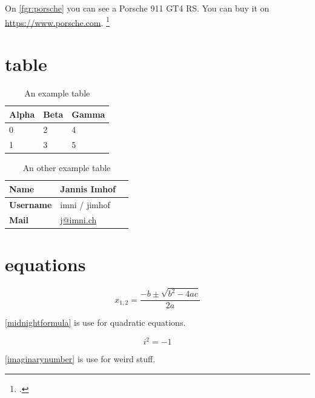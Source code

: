 \documentclass{scrreprt}
\begin{document}
On \autoref{fgr:porsche} you can see a Porsche 911 GT4 RS.
You can buy it on \url{https://www.porsche.com}.
\footcite{imni}

\section{table}

\begin{table}[!h]
    \centering
    \begin{tabularx}{0.5\textwidth}{XXX}
        \hline
        Alpha     & Beta     & Gamma     \\ \hline
        0         & 2        & 4         \\ \hline
        1         & 3        & 5         \\ \hline
    \end{tabularx}
    \caption{An example table}
    \label{tbl:example}
\end{table}

\begin{table}[h]
    \centering
    \begin{tabularx}{\textwidth}{lll}
        
        \hline
        \textbf{Name} & Jannis Imhof
        \\ \hline
        \textbf{Username} & imni / jimhof
        \\ \hline
        \textbf{Mail} & \href{mailto:j@imni.ch}{j@imni.ch}
        \\ \hline

    \end{tabularx}
    \caption{An other example table}
    \label{tbl:otherexample}
\end{table}


\lipsum[2-5]

\section{equations}

\begin{equation}
x_{1,2}=\frac{-b\pm\sqrt{b^2-4ac}}{2a}
\label{midnightformula}
\end{equation}

\autoref{midnightformula} is use for quadratic equations.

\begin{equation}
    i^2 = -1
\label{imaginarynumber}
\end{equation}

\autoref{imaginarynumber} is use for weird stuff.
\end{document}
